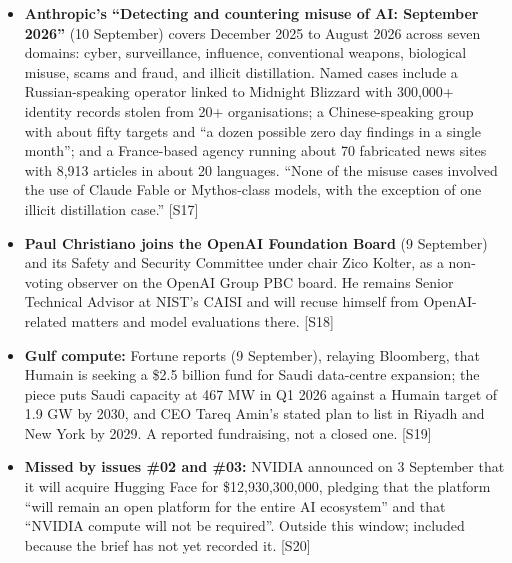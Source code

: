 \documentclass[11pt,a4paper]{article}
\newcommand{\srcref}[1]{\textcolor{brandaccent}{[S#1]}}
\begin{document}
\begin{itemize}
  \item \textbf{Anthropic's ``Detecting and countering misuse of AI: September 2026''}
        (10 September) covers December 2025 to August 2026 across seven domains: cyber,
        surveillance, influence, conventional weapons, biological misuse, scams and fraud,
        and illicit distillation. Named cases include a Russian-speaking operator linked to
        Midnight Blizzard with 300{,}000+ identity records stolen from 20+ organisations;
        a Chinese-speaking group with about fifty targets and ``a dozen possible zero day
        findings in a single month''; and a France-based agency running about 70
        fabricated news sites with 8{,}913 articles in about 20 languages. ``None of the misuse cases involved the use of Claude Fable
        or Mythos-class models, with the exception of one illicit distillation case.''
        \srcref{17}
  \item \textbf{Paul Christiano joins the OpenAI Foundation Board} (9 September) and its
        Safety and Security Committee under chair Zico Kolter, as a non-voting observer on
        the OpenAI Group PBC board. He remains Senior Technical Advisor at NIST's CAISI and
        will recuse himself from OpenAI-related matters and model evaluations there.
        \srcref{18}
  \item \textbf{Gulf compute:} Fortune reports (9 September), relaying Bloomberg, that
        Humain is seeking a \$2.5 billion fund for Saudi data-centre expansion; the piece
        puts Saudi capacity at 467 MW in Q1 2026 against a Humain target of 1.9 GW by 2030,
        and CEO Tareq Amin's stated plan to list in Riyadh and New York by 2029. A
        reported fundraising, not a closed one. \srcref{19}
  \item \textbf{Missed by issues \#02 and \#03:} NVIDIA announced on 3 September that it
        will acquire Hugging Face for \$12{,}930{,}300{,}000, pledging that the platform
        ``will remain an open platform for the entire AI ecosystem'' and that ``NVIDIA
        compute will not be required''. Outside this window; included because the brief has
        not yet recorded it. \srcref{20}
\end{itemize}

\end{document}
